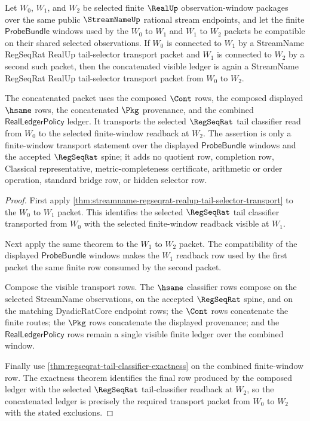 \begin{theorem}
\label{thm:streamname-regseqrat-realup-tail-selector-transport-composition}
Let $W_0$, $W_1$, and $W_2$ be selected finite $\RealUp$ observation-window
packages over the same public $\StreamNameUp$ rational stream endpoints, and
let the finite $\mathsf{ProbeBundle}$ windows used by the $W_0$ to $W_1$ and
$W_1$ to $W_2$ packets be compatible on their shared selected observations. If
$W_0$ is connected to $W_1$ by a StreamName RegSeqRat RealUp tail-selector
transport packet and $W_1$ is connected to $W_2$ by a second such packet, then
the concatenated visible ledger is again a StreamName RegSeqRat RealUp
tail-selector transport packet from $W_0$ to $W_2$.

The concatenated packet uses the composed $\Cont$ rows, the composed displayed
$\hsame$ rows, the concatenated $\Pkg$ provenance, and the combined
$\mathsf{RealLedgerPolicy}$ ledger. It transports the selected $\RegSeqRat$
tail classifier read from $W_0$ to the selected finite-window readback at
$W_2$. The assertion is only a finite-window transport statement over the
displayed $\mathsf{ProbeBundle}$ windows and the accepted $\RegSeqRat$ spine;
it adds no quotient row, completion row, Classical representative,
metric-completeness certificate, arithmetic or order operation, standard bridge
row, or hidden selector row.
\end{theorem}
\begin{proof}
First apply
\autoref{thm:streamname-regseqrat-realup-tail-selector-transport} to the
$W_0$ to $W_1$ packet. This identifies the selected $\RegSeqRat$ tail
classifier transported from $W_0$ with the selected finite-window readback
visible at $W_1$.

Next apply the same theorem to the $W_1$ to $W_2$ packet. The compatibility of
the displayed $\mathsf{ProbeBundle}$ windows makes the $W_1$ readback row used
by the first packet the same finite row consumed by the second packet.

Compose the visible transport rows. The $\hsame$ classifier rows compose on
the selected StreamName observations, on the accepted $\RegSeqRat$ spine, and
on the matching DyadicRatCore endpoint rows; the $\Cont$ rows concatenate the
finite routes; the $\Pkg$ rows concatenate the displayed provenance; and the
$\mathsf{RealLedgerPolicy}$ rows remain a single visible finite ledger over the
combined window.

Finally use \autoref{thm:regseqrat-tail-classifier-exactness} on the combined
finite-window row. The exactness theorem identifies the final row produced by
the composed ledger with the selected $\RegSeqRat$ tail-classifier readback at
$W_2$, so the concatenated ledger is precisely the required transport packet
from $W_0$ to $W_2$ with the stated exclusions.
\end{proof}

